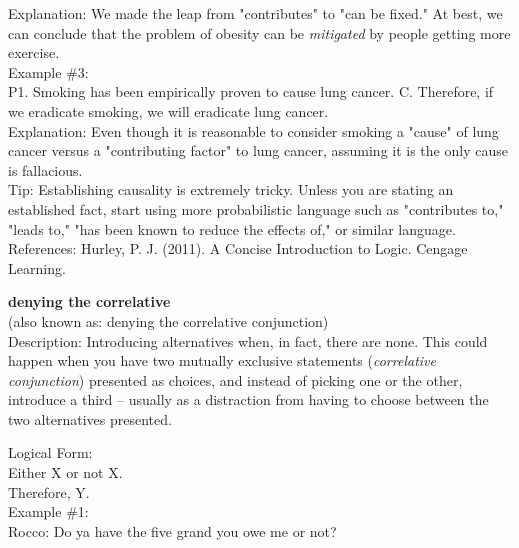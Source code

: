 \documentclass[a4paper,12pt,single,pdftex]{scrartcl}
\begin{document}
    
      Explanation: We made the leap from "contributes" to "can be fixed." At best, we can conclude that the problem of obesity can be {\it mitigated}  by people getting more exercise.
    \\

    
      Example \#3:
    \\

    
      P1. Smoking has been empirically proven to cause lung cancer. \newline
C. Therefore, if we eradicate smoking, we will eradicate lung cancer.
    \\

    
      Explanation: Even though it is reasonable to consider smoking a "cause" of lung cancer versus a "contributing factor" to lung cancer, assuming it is the only cause is fallacious.
    \\

    
      Tip: Establishing causality is extremely tricky. Unless you are stating an established fact, start using more probabilistic language such as "contributes to," "leads to," "has been known to reduce the effects of," or similar language.
    \\

    References: Hurley, P. J. (2011). A Concise Introduction to Logic. Cengage Learning.
  
    
      {\bf denying the correlative}
    \\

  
    
      (also known as: denying the correlative conjunction)
    \\

  
    Description: Introducing alternatives when, in fact, there are none.  This could happen when you have two mutually exclusive statements ({\it correlative conjunction}) presented as choices, and instead of picking one or the other, introduce a third -- usually as  a distraction from having to choose between the two alternatives presented. 

    
      Logical Form:
    \\

    
      Either X or not X.
    \\

    
      Therefore, Y.
    \\

    
      Example \#1:
    \\

    
      Rocco:  Do ya have the five grand you owe me or not?
    \\
\end{document}
